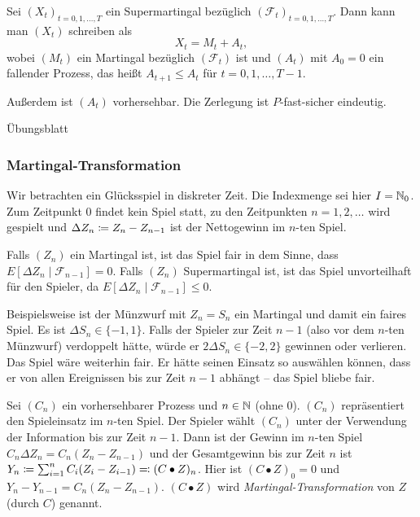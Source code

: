 \documentclass[a4paper,twoside,DIV15,BCOR12mm]{scrbook}
\newcommand{\cF}{\mathcal F}
\newcommand{\dickerkringel}{\bullet}
\begin{document}
\begin{lemma}
Sei $(X_t)_{t=0, 1,\ldots,T}$ ein Supermartingal bezüglich $(\cF_t)_{t=0, 1,\ldots,T}$. Dann kann man $(X_t)$ schreiben als
\[
X_t = M_t + A_t,
\]
wobei $(M_t)$ ein Martingal bezüglich $(\cF_t)$ ist und $(A_t)$ mit $A_0=0$ ein fallender Prozess, das heißt $A_{t+1}\le A_t$ für $t=0, 1,\ldots,T-1$.\label{lem:2.1.18}

Außerdem ist $(A_t)$ vorhersehbar. Die Zerlegung ist $P$-fast-sicher eindeutig.
\end{lemma}

\begin{beweis}
Übungsblatt
\end{beweis}

\subsubsection*{Martingal-Transformation}

Wir betrachten ein Glücksspiel in diskreter Zeit. Die Indexmenge sei hier $I=\mathbb{N}_0$. Zum Zeitpunkt 0 findet kein Spiel statt, zu den Zeitpunkten $n=1,2,\ldots$ wird gespielt und $\Delta Z_n \da Z_n-Z_{n-1}$ ist der Nettogewinn im $n$-ten Spiel.

Falls $(Z_n)$ ein Martingal ist, ist das Spiel fair in dem Sinne, dass $E[\Delta Z_n \mid \cF_{n-1}]=0$. Falls $(Z_n)$ Supermartingal ist, ist das Spiel unvorteilhaft für den Spieler, da $E[\Delta Z_n\mid \cF_{n-1}]\le 0$.

Beispielsweise ist der Münzwurf mit $Z_n=S_n$ ein Martingal und damit ein faires Spiel. Es ist $\Delta S_n\in\{-1,1\}$. Falls der Spieler zur Zeit $n-1$ (also vor dem $n$-ten Münzwurf) verdoppelt hätte, würde er $2\Delta S_n \in \{-2,2\}$ gewinnen oder verlieren. Das Spiel wäre weiterhin fair. Er hätte seinen Einsatz so auswählen können, dass er von allen Ereignissen bis zur Zeit $n-1$ abhängt – das Spiel bliebe fair.

Sei $(C_n)$ ein vorhersehbarer Prozess und $n\in\mathbb{N}$ (ohne 0). $(C_n)$ repräsentiert den Spieleinsatz im $n$-ten Spiel. Der Spieler wählt $(C_n)$ unter der Verwendung der Information bis zur Zeit $n-1$. Dann ist der Gewinn im $n$-ten Spiel $C_n\Delta Z_n = C_n(Z_n - Z_{n-1})$ und der Gesamtgewinn bis zur Zeit $n$ ist $Y_n \da \sum_{i=1}^n C_i (Z_i - Z_{i-1}) \ad (C\dickerkringel Z)_n$. Hier ist $(C\dickerkringel Z)_0=0$ und $Y_n - Y_{n-1} = C_n(Z_n-Z_{n-1})$. $(C\dickerkringel Z)$ wird \emph{Martingal-Transformation} von $Z$ (durch $C$) genannt.
\end{document}
